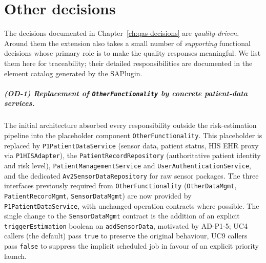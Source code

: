 \chapter{Other decisions}
\label{ch:other-decisions}

The decisions documented in Chapter~\ref{ch:qas-decisions} are
\emph{quality-driven}. Around them the extension also takes a small
number of \emph{supporting} functional decisions whose primary role is to
make the quality responses meaningful. We list them here for traceability;
their detailed responsibilities are documented in the element catalog
generated by the SAPlugin.

\paragraph{(OD-1) Replacement of \texttt{OtherFunctionality} by concrete
patient-data services.}
The initial architecture absorbed every responsibility outside the
risk-estimation pipeline into the placeholder component
\texttt{OtherFunctionality}. This placeholder is replaced by
\texttt{P1PatientDataService} (sensor data, patient status, HIS EHR proxy
via \texttt{P1HISAdapter}), the \texttt{PatientRecordRepository}
(authoritative patient identity and risk level),
\texttt{PatientManagementService} and \texttt{UserAuthenticationService},
and the dedicated \texttt{Av2SensorDataRepository} for raw sensor
packages. The three interfaces previously required from
\texttt{OtherFunctionality} (\texttt{OtherDataMgmt},
\texttt{PatientRecordMgmt}, \texttt{SensorDataMgmt}) are now provided by
\texttt{P1PatientDataService}, with unchanged operation contracts where
possible. The single change to the \texttt{SensorDataMgmt} contract is
the addition of an explicit \texttt{triggerEstimation} boolean on
\texttt{addSensorData}, motivated by AD-P1-5; UC4 callers (the default)
pass \texttt{true} to preserve the original behaviour, UC9 callers pass
\texttt{false} to suppress the implicit scheduled job in favour of an
explicit priority launch.

